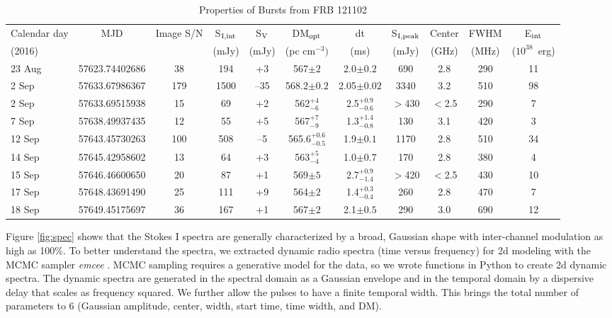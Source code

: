 \documentclass[twocolumn]{aastex61}
\newcommand{\frb}{FRB 121102}
\begin{document}
\begin{table}
\caption{Properties of Bursts from \frb}
\centering
\begin{tabular}{lc|ccc|cccccc}
\hline
Calendar day & MJD   & Image S/N & S$_{\rm{I,int}}$	& S$_{\rm{V}}$ 	& DM$_{\rm{opt}}$ 	& dt 			& S$_{\rm{I,peak}}$ & Center & FWHM & E$_{\rm{int}}$ \\
(2016)       &       &           & (mJy) 			& (mJy) 		& (pc cm$^{-3})$ 	& (ms) 			& (mJy) 			& (GHz)  & (MHz) & ($10^{38}$\ erg)\\ \hline
23 Aug & 57623.74402686      & 38 		& 194				& +3			& 567$\pm2$ 		& 2.0$\pm0.2$	 		& 690 		& 2.8 		& 290 & 11 			\\
2 Sep & 57633.67986367      & 179 		& 1500				& --35 			& 568.2$\pm0.2$ 	& 2.05$\pm0.02$			& 3340 		& 3.2 		& 510 & 98				\\
2 Sep & 57633.69515938\tablenotemark{a} & 15 & 69			& +2			& 562$^{+4}_{-6}$ 	& 2.5$^{+0.9}_{-0.6}$	& $>$430 	& $<$2.5	& 290 & 7  			\\
7 Sep & 57638.49937435      & 12 		& 55				& +5 			& 567$^{+7}_{-9}$ 	& 1.3$^{+1.4}_{-0.8}$	& 130 		& 3.1 		& 420 & 3  			\\
12 Sep & 57643.45730263      & 100 		& 508				& --5 			& 565.6$^{+0.6}_{-0.5}$ & 1.9$\pm0.1$		& 1170 		& 2.8 		& 510 & 34 			\\
14 Sep & 57645.42958602      & 13 		& 64 				& +3			& 563$^{+5}_{-4}$ 	& 1.0$\pm0.7$		 	& 170 		& 2.8 		& 380 & 4  			\\
15 Sep & 57646.46600650\tablenotemark{a} & 20 & 87			& +1			& 569$\pm5$ 		& 2.7$^{+0.9}_{-1.4}$	& $>$420 	& $<$2.5 	& 430 & 10 			\\
17 Sep & 57648.43691490\tablenotemark{b} & 25 & 111			& +9			& 564$\pm2$ 		& 1.4$^{+0.3}_{-0.4}$	& 260 		& 2.8 		& 470 & 7  			\\
18 Sep & 57649.45175697      & 36 		& 167				& +1			& 567$\pm2$ 		& 2.1$\pm0.5$		 	& 290 		& 3.0 		& 690 & 12 			\\ \hline
\end{tabular}
\label{tab:spec}
\end{table} 

Figure \ref{fig:spec} shows that the Stokes I spectra are generally characterized by a broad, Gaussian shape with inter-channel modulation as high as 100\%. To better understand the spectra, we extracted dynamic radio spectra (time versus frequency) for 2d modeling with the MCMC sampler \emph{emcee} \citep{2013PASP..125..306F}. MCMC sampling requires a generative model for the data, so we wrote functions in Python to create 2d dynamic spectra. The dynamic spectra are generated in the spectral domain as a Gaussian envelope and in the temporal domain by a dispersive delay that scales as frequency squared. We further allow the pulses to have a finite temporal width. This brings the total number of parameters to 6 (Gaussian amplitude, center, width, start time, time width, and DM). 
\end{document}
